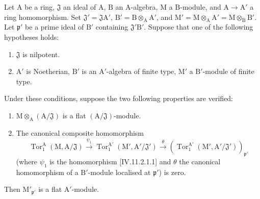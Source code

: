 \begin{lemma}[11.2.5]
\label{IV.11.2.5}
Let $\mathrm{A}$ be a ring, $\mathfrak{J}$ an ideal of $\mathrm{A}$,
$\mathrm{B}$ an $\mathrm{A}$-algebra, $\mathrm{M}$ a
$\mathrm{B}$-module, and $\mathrm{A}\to\mathrm{A}'$ a ring
homomorphism. Set
$\mathfrak{J}'=\mathfrak{J}\mathrm{A}'$,
$\mathrm{B}'=\mathrm{B}\otimes_\mathrm{A}\mathrm{A}'$, and
$\mathrm{M}'=\mathrm{M}\otimes_\mathrm{A}\mathrm{A}'
=\mathrm{M}\otimes_\mathrm{B}\mathrm{B}'$. Let
$\mathfrak{p}'$ be a prime ideal of $\mathrm{B}'$ containing
$\mathfrak{J}'\mathrm{B}'$. Suppose that one of the following
hypotheses holds:
\begin{enumerate}[label=\emph{\alph*)}]
  \item $\mathfrak{J}$ is nilpotent.
  \item $\mathrm{A}'$ is Noetherian, $\mathrm{B}'$ is an $\mathrm{A}'$-algebra of finite type, $\mathrm{M}'$ a $\mathrm{B}'$-module of finite type.
\end{enumerate}
Under these conditions, suppose the two following properties are verified:
\begin{enumerate}[label=\emph{(\roman*)}]
  \item $\mathrm{M}\otimes_\mathrm{A}(\mathrm{A}/\mathfrak{J})$ is a flat $(\mathrm{A}/\mathfrak{J})$-module.
  \item The canonical composite homomorphism
\[
  \operatorname{Tor}_1^\mathrm{A}(\mathrm{M},\mathrm{A}/\mathfrak{J})\xrightarrow{\psi_1}\operatorname{Tor}_1^{\mathrm{A}'}(\mathrm{M}',\mathrm{A}'/\mathfrak{J}')\xrightarrow{\theta}(\operatorname{Tor}_1^{\mathrm{A}'}(\mathrm{M}',\mathrm{A}'/\mathfrak{J}'))_{\mathfrak{p}'}
\]
(where $\psi_1$ is the homomorphism [IV.11.2.1.1] and $\theta$ the canonical homomorphism of a $\mathrm{B}'$-module localised at $\mathfrak{p}'$) is zero.
\end{enumerate}

Then $\mathrm{M}'_{\mathfrak{p}'}$ is a flat $\mathrm{A}'$-module.
\end{lemma}

